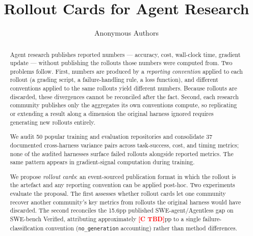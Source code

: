 \documentclass{article}
\title{Rollout Cards for Agent Research}
\author{%
  Anonymous Authors
}
\newcommand{\expnum}[1]{\textcolor{red}{\textbf{[#1]}}}
\begin{document}
\maketitle


\begin{abstract}
Agent research publishes reported numbers --- accuracy, cost,
wall-clock time, gradient update --- without publishing the
rollouts those numbers were computed from. Two problems
follow. First, numbers are produced by a \emph{reporting
convention} applied to each rollout (a grading script, a
failure-handling rule, a loss function), and different
conventions applied to the same rollouts yield different
numbers. Because rollouts are discarded, these divergences
cannot be reconciled after the fact. Second, each research
community publishes only the aggregates its own conventions
compute, so replicating or extending a result along a dimension
the original harness ignored requires generating new rollouts
entirely.

We audit 50 popular training and evaluation repositories and
consolidate 37 documented cross-harness variance pairs across
task-success, cost, and timing metrics; none of the audited
harnesses surface failed rollouts alongside reported metrics.
The same pattern appears in gradient-signal computation
during training.

We propose \emph{rollout cards}: an event-sourced publication
format in which the rollout is the artefact and any reporting
convention can be applied post-hoc. Two experiments evaluate
the proposal. The first assesses whether rollout cards let
one community recover another community's key metrics from
rollouts the original harness would have discarded. The
second reconciles the 15.6pp published SWE-agent/Agentless
gap on SWE-bench Verified, attributing approximately
\expnum{C TBD}pp to a single failure-classification
convention (\texttt{no\_generation} accounting) rather than
method differences.
\end{abstract}
\end{document}
